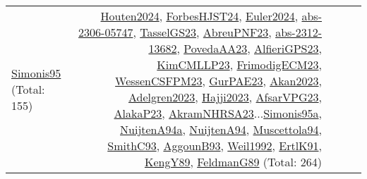 {\begin{longtable}{p{3cm}r>{\raggedright\arraybackslash}p{6cm}>{\raggedright\arraybackslash}p{6cm}>{\raggedright\arraybackslash}p{8cm}}
\hyperref[detail:Simonis95]{Simonis95} (Total: 155) & \hyperref[detail:Houten2024]{Houten2024}, \hyperref[detail:ForbesHJST24]{ForbesHJST24}, \hyperref[detail:Euler2024]{Euler2024}, \hyperref[detail:abs-2306-05747]{abs-2306-05747}, \hyperref[detail:TasselGS23]{TasselGS23}, \hyperref[detail:AbreuPNF23]{AbreuPNF23}, \hyperref[detail:abs-2312-13682]{abs-2312-13682}, \hyperref[detail:PovedaAA23]{PovedaAA23}, \hyperref[detail:AlfieriGPS23]{AlfieriGPS23}, \hyperref[detail:KimCMLLP23]{KimCMLLP23}, \hyperref[detail:FrimodigECM23]{FrimodigECM23}, \hyperref[detail:WessenCSFPM23]{WessenCSFPM23}, \hyperref[detail:GurPAE23]{GurPAE23}, \hyperref[detail:Akan2023]{Akan2023}, \hyperref[detail:Adelgren2023]{Adelgren2023}, \hyperref[detail:Hajji2023]{Hajji2023}, \hyperref[detail:AfsarVPG23]{AfsarVPG23}, \hyperref[detail:AlakaP23]{AlakaP23}, \hyperref[detail:AkramNHRSA23]{AkramNHRSA23}...\hyperref[detail:Simonis95a]{Simonis95a}, \hyperref[detail:NuijtenA94a]{NuijtenA94a}, \hyperref[detail:NuijtenA94]{NuijtenA94}, \hyperref[detail:Muscettola94]{Muscettola94}, \hyperref[detail:SmithC93]{SmithC93}, \hyperref[detail:AggounB93]{AggounB93}, \hyperref[detail:Weil1992]{Weil1992}, \hyperref[detail:ErtlK91]{ErtlK91}, \hyperref[detail:KengY89]{KengY89}, \hyperref[detail:FeldmanG89]{FeldmanG89} (Total: 264)\\
\end{longtable}
}

\clearpage
